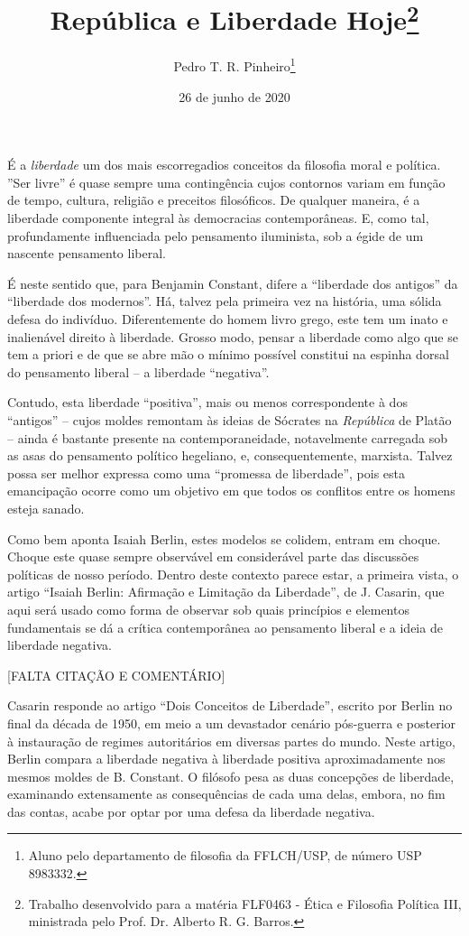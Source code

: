 \documentclass[12pt,a4paper]{article}
\author{Pedro T. R. Pinheiro\footnote{Aluno pelo departamento de filosofia 
da FFLCH/USP, de número USP 8983332. }}
\title{República e Liberdade Hoje\footnote{
	Trabalho desenvolvido para a matéria FLF0463 - Ética e Filosofia 
	Política III, ministrada pelo Prof. Dr. Alberto R. G. Barros. }}
\date{26 de junho de 2020}
\begin{document}
	\maketitle
	
	\onehalfspacing
	\setlength{\parskip}{0.5cm}

	É a \textit{liberdade} um dos mais escorregadios conceitos da 
	filosofia moral e política. ”Ser livre” é quase sempre uma 
	contingência cujos contornos variam em função de tempo, cultura, 
	religião e preceitos filosóficos. De qualquer maneira, é a 
	liberdade componente integral às democracias contemporâneas. E, 
	como tal, profundamente influenciada pelo pensamento iluminista, 
	sob a égide de um nascente pensamento liberal. 

	É neste sentido que, para Benjamin Constant, difere a “liberdade 
	dos antigos” da “liberdade dos modernos”. Há, talvez pela primeira 
	vez na história, uma sólida defesa do indivíduo. Diferentemente do 
	homem livro grego, este tem um inato e inalienável direito à 
	liberdade. Grosso modo, pensar a liberdade como algo que se tem 
	a priori e de que se abre mão o mínimo possível constitui na 
	espinha dorsal do pensamento liberal -- a liberdade “negativa”. 

	Contudo, esta liberdade “positiva”, mais ou menos correspondente 
	à dos “antigos” -- cujos moldes remontam às ideias de Sócrates na 
	\textit{República} de Platão -- ainda é bastante presente na 
	contemporaneidade, notavelmente carregada sob as asas do pensamento 
	político hegeliano, e, consequentemente, marxista. Talvez possa ser 
	melhor expressa como uma “promessa de liberdade”, pois esta 
	emancipação ocorre como um objetivo em que todos os conflitos entre 
	os homens esteja sanado. 

	Como bem aponta Isaiah Berlin, estes modelos se colidem, entram em 
	choque. Choque este quase sempre observável em considerável parte 
	das discussões políticas de nosso período. Dentro deste contexto 
	parece estar, a primeira vista, o artigo “Isaiah Berlin: Afirmação 
	e Limitação da Liberdade”, de J. Casarin, que aqui será usado como 
	forma de observar sob quais princípios e elementos fundamentais se 
	dá a crítica contemporânea ao pensamento liberal e a ideia de 
	liberdade negativa. 

	[FALTA CITAÇÃO E COMENTÁRIO]
	
	Casarin responde ao artigo “Dois Conceitos de Liberdade”, escrito 
	por Berlin no final da década de 1950, em meio a um devastador 
	cenário pós-guerra e posterior à instauração de regimes autoritários 
	em diversas partes do mundo. Neste artigo, Berlin compara a liberdade 
	negativa à liberdade positiva aproximadamente nos mesmos moldes de 
	B. Constant. O filósofo pesa as duas concepções de liberdade, 
	examinando extensamente as consequências de cada uma delas, embora, 
	no fim das contas, acabe por optar por uma defesa da liberdade 
	negativa. 
\end{document}
